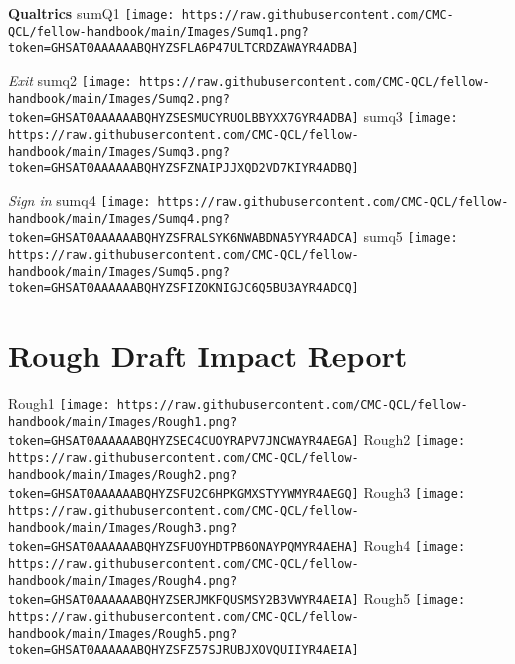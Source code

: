 \documentclass[
]{book}
\begin{document}
\textbf{Qualtrics}
sumQ1
\texttt{[image: https://raw.githubusercontent.com/CMC-QCL/fellow-handbook/main/Images/Sumq1.png?token=GHSAT0AAAAAABQHYZSFLA6P47ULTCRDZAWAYR4ADBA]}

\emph{Exit}
sumq2
\texttt{[image: https://raw.githubusercontent.com/CMC-QCL/fellow-handbook/main/Images/Sumq2.png?token=GHSAT0AAAAAABQHYZSESMUCYRUOLBBYXX7GYR4ADBA]}
sumq3
\texttt{[image: https://raw.githubusercontent.com/CMC-QCL/fellow-handbook/main/Images/Sumq3.png?token=GHSAT0AAAAAABQHYZSFZNAIPJJXQD2VD7KIYR4ADBQ]}

\emph{Sign in}
sumq4
\texttt{[image: https://raw.githubusercontent.com/CMC-QCL/fellow-handbook/main/Images/Sumq4.png?token=GHSAT0AAAAAABQHYZSFRALSYK6NWABDNA5YYR4ADCA]}
sumq5
\texttt{[image: https://raw.githubusercontent.com/CMC-QCL/fellow-handbook/main/Images/Sumq5.png?token=GHSAT0AAAAAABQHYZSFIZOKNIGJC6Q5BU3AYR4ADCQ]}

\hypertarget{rough-draft-impact-report}{%
\section{Rough Draft Impact Report}\label{rough-draft-impact-report}}

Rough1
\texttt{[image: https://raw.githubusercontent.com/CMC-QCL/fellow-handbook/main/Images/Rough1.png?token=GHSAT0AAAAAABQHYZSEC4CUOYRAPV7JNCWAYR4AEGA]}
Rough2
\texttt{[image: https://raw.githubusercontent.com/CMC-QCL/fellow-handbook/main/Images/Rough2.png?token=GHSAT0AAAAAABQHYZSFU2C6HPKGMXSTYYWMYR4AEGQ]}
Rough3
\texttt{[image: https://raw.githubusercontent.com/CMC-QCL/fellow-handbook/main/Images/Rough3.png?token=GHSAT0AAAAAABQHYZSFUOYHDTPB6ONAYPQMYR4AEHA]}
Rough4
\texttt{[image: https://raw.githubusercontent.com/CMC-QCL/fellow-handbook/main/Images/Rough4.png?token=GHSAT0AAAAAABQHYZSERJMKFQUSMSY2B3VWYR4AEIA]}
Rough5
\texttt{[image: https://raw.githubusercontent.com/CMC-QCL/fellow-handbook/main/Images/Rough5.png?token=GHSAT0AAAAAABQHYZSFZ57SJRUBJXOVQUIIYR4AEIA]}

  
\end{document}
